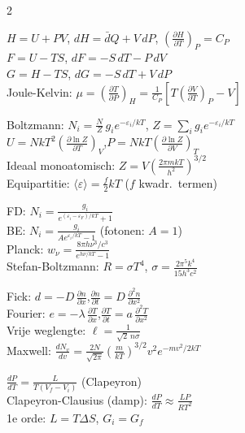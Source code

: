 \documentclass[10pt,a4paper]{article}
\newcommand{\dbar}{\bar{d}}
\newcommand{\pder}[2]{\left(\frac{\partial #1}{\partial #2}\right)}
\begin{document}
\begin{multicols}{2}
\begin{keyformulas}[title=Thermodynamische Functies]
$H = U + PV$,\; $dH = \dbar Q + V\,dP$,\; $\pder{H}{T}_P = C_P$\\
$F = U - TS$,\; $dF = -S\,dT - P\,dV$\\
$G = H - TS$,\; $dG = -S\,dT + V\,dP$\\
Joule-Kelvin: $\mu = \pder{T}{P}_H = \frac{1}{C_P}\!\left[T\pder{V}{T}_P - V\right]$
\end{keyformulas}

\begin{keyformulas}[title=Statistische Mechanica]
Boltzmann: $N_i = \frac{N}{Z}\,g_i e^{-\varepsilon_i/kT}$,\; $Z = \sum_i g_i e^{-\varepsilon_i/kT}$\\
$U = NkT^2\pder{\ln Z}{T}_V$,\quad $P = NkT\pder{\ln Z}{V}_T$\\
Ideaal monoatomisch: $Z = V\!\left(\frac{2\pi mkT}{h^2}\right)^{3/2}$\\
Equipartitie: $\langle\varepsilon\rangle = \frac{f}{2}kT$\; ($f$ kwadr.\ termen)
\end{keyformulas}

\begin{keyformulas}[title=Fermi-Dirac / Bose-Einstein]
FD: $N_i = \frac{g_i}{e^{(\varepsilon_i-\varepsilon_F)/kT}+1}$\\
BE: $N_i = \frac{g_i}{Ae^{\varepsilon_i/kT}-1}$\; (fotonen: $A=1$)\\
Planck: $w_\nu = \frac{8\pi h\nu^3/c^3}{e^{h\nu/kT}-1}$\\
Stefan-Boltzmann: $R = \sigma T^4$,\; $\sigma = \frac{2\pi^5 k^4}{15h^3c^2}$
\end{keyformulas}

\begin{keyformulas}[title=Transport]
Fick: $d = -D\,\frac{\partial n}{\partial x}$,\quad $\frac{\partial n}{\partial t} = D\,\frac{\partial^2 n}{\partial x^2}$\\
Fourier: $e = -\lambda\,\frac{\partial T}{\partial x}$,\quad $\frac{\partial T}{\partial t} = a\,\frac{\partial^2 T}{\partial x^2}$\\
Vrije weglengte: $\ell = \frac{1}{\sqrt{2}\,n\sigma}$\\
Maxwell: $\frac{dN_v}{dv} = \frac{2N}{\sqrt{2\pi}}\!\left(\frac{m}{kT}\right)^{3/2}\!v^2 e^{-mv^2/2kT}$
\end{keyformulas}

\begin{keyformulas}[title=Clapeyron / Faseover-gangen]
$\frac{dP}{dT} = \frac{L}{T(V_f-V_i)}$\; (Clapeyron)\\
Clapeyron-Clausius (damp): $\frac{dP}{dT} \approx \frac{LP}{RT^2}$\\
1e orde: $L = T\Delta S$,\; $G_i = G_f$
\end{keyformulas}

\end{multicols}
\end{document}
